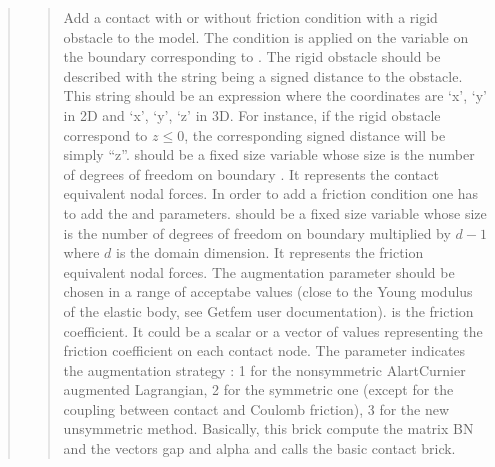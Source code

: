 \documentclass[a4paper,11pt,english]{sphinxmanual}
\begin{document}
\begin{quote}
\begin{quote}

Add a contact with or without friction condition with a rigid obstacle
to the model. The condition is applied on the variable 
on the boundary corresponding to . The rigid obstacle should
be described with the string  being a signed distance to
the obstacle. This string should be an expression where the coordinates
are ‘x’, ‘y’ in 2D and ‘x’, ‘y’, ‘z’ in 3D. For instance, if the rigid
obstacle correspond to \(z \le 0\), the corresponding signed distance
will be simply “z”.  should be a fixed size variable whose size
is the number of degrees of freedom on boundary . It represents the
contact equivalent nodal forces. In order to add a friction condition
one has to add the  and  parameters.
 should be a fixed size variable whose size is
the number of degrees of freedom on boundary  multiplied by
\(d-1\) where \(d\) is the domain dimension. It represents
the friction equivalent nodal forces.
The augmentation parameter  should be chosen in a
range of acceptabe values (close to the Young modulus of the elastic
body, see Getfem user documentation).   is
the friction coefficient. It could be a scalar or a vector of values
representing the friction coefficient on each contact node.
The parameter 
indicates the augmentation strategy : 1 for the non\sphinxhyphen{}symmetric
Alart\sphinxhyphen{}Curnier augmented Lagrangian, 2 for the symmetric one (except for
the coupling between contact and Coulomb friction),
3 for the new unsymmetric method.
Basically, this brick compute the matrix BN
and the vectors gap and alpha and calls the basic contact brick.
\end{quote}

\begin{quote}


\end{quote}
\end{quote}
\end{document}
